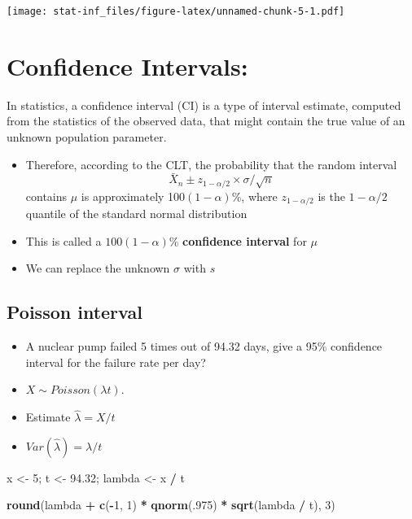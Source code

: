 \documentclass[]{article}
\newenvironment{Shaded}{\begin{snugshade}}{\end{snugshade}}
\newcommand{\DecValTok}[1]{\textcolor[rgb]{0.00,0.00,0.81}{#1}}
\newcommand{\FloatTok}[1]{\textcolor[rgb]{0.00,0.00,0.81}{#1}}
\newcommand{\KeywordTok}[1]{\textcolor[rgb]{0.13,0.29,0.53}{\textbf{#1}}}
\newcommand{\NormalTok}[1]{#1}
\newcommand{\OperatorTok}[1]{\textcolor[rgb]{0.81,0.36,0.00}{\textbf{#1}}}
\newcommand{\StringTok}[1]{\textcolor[rgb]{0.31,0.60,0.02}{#1}}
\begin{document}
\texttt{[image: stat-inf\_files/figure-latex/unnamed-chunk-5-1.pdf]}

\hypertarget{confidence-intervals}{%
\section{Confidence Intervals:}\label{confidence-intervals}}

In statistics, a confidence interval (CI) is a type of interval
estimate, computed from the statistics of the observed data, that might
contain the true value of an unknown population parameter.

\begin{itemize}
\item
  Therefore, according to the CLT, the probability that the random
  interval \[\bar X_n \pm z_{1-\alpha/2}\times\sigma / \sqrt{n}\]
  contains \(\mu\) is approximately 100\((1-\alpha)\)\%, where
  \(z_{1-\alpha/2}\) is the \(1-\alpha/2\) quantile of the standard
  normal distribution
\item
  This is called a \(100(1 - \alpha)\)\% \textbf{confidence interval}
  for \(\mu\)
\item
  We can replace the unknown \(\sigma\) with \(s\)
\end{itemize}

\hypertarget{poisson-interval}{%
\subsection{Poisson interval}\label{poisson-interval}}

\begin{itemize}
\item
  A nuclear pump failed 5 times out of 94.32 days, give a 95\%
  confidence interval for the failure rate per day?
\item
  \(X \sim Poisson(\lambda t)\).
\item
  Estimate \(\hat \lambda = X/t\)
\item
  \(Var(\hat \lambda) = \lambda / t\)
\end{itemize}

\begin{Shaded}
\begin{Highlighting}[]
\NormalTok{x <-}\StringTok{ }\DecValTok{5}\NormalTok{; t <-}\StringTok{ }\FloatTok{94.32}\NormalTok{; lambda <-}\StringTok{ }\NormalTok{x }\OperatorTok{/}\StringTok{ }\NormalTok{t}

\KeywordTok{round}\NormalTok{(lambda }\OperatorTok{+}\StringTok{ }\KeywordTok{c}\NormalTok{(}\OperatorTok{-}\DecValTok{1}\NormalTok{, }\DecValTok{1}\NormalTok{) }\OperatorTok{*}\StringTok{ }\KeywordTok{qnorm}\NormalTok{(.}\DecValTok{975}\NormalTok{) }\OperatorTok{*}\StringTok{ }\KeywordTok{sqrt}\NormalTok{(lambda }\OperatorTok{/}\StringTok{ }\NormalTok{t), }\DecValTok{3}\NormalTok{)}
\end{Highlighting}
\end{Shaded}
\end{document}
